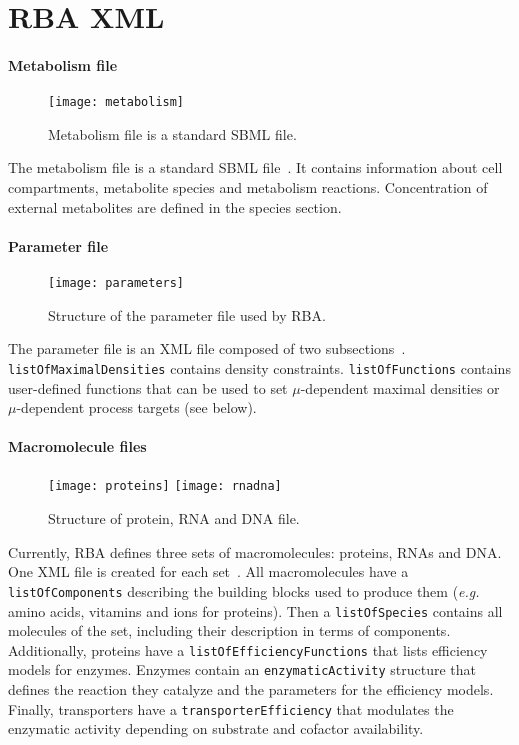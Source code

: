 
\section{RBA XML}
\label{sec:rba_xml}

\paragraph{Metabolism file}
\begin{figure}[ht]
  \centering
  \texttt{[image: metabolism]}
  \caption{Metabolism file is a standard SBML file.}
  \label{fig:metabolism}
\end{figure}
The metabolism file is a standard SBML file~. It contains information about cell compartments, metabolite species and metabolism reactions. Concentration of external metabolites are defined in the species section.

\paragraph{Parameter file}
\begin{figure}[ht]
  \centering
  \texttt{[image: parameters]}
  \caption{Structure of the parameter file used by RBA.}
  \label{fig:parameters}
\end{figure}
The parameter file is an XML file composed of two subsections~. \texttt{listOfMaximalDensities} contains density constraints. \texttt{listOfFunctions} contains user-defined functions that can be used to set $\mu$-dependent maximal densities or $\mu$-dependent process targets (see below).

\paragraph{Macromolecule files}
\begin{figure}[ht]
  \centering
  \texttt{[image: proteins]}
  \texttt{[image: rnadna]}
  \caption{Structure of protein, RNA and DNA file.}
  \label{fig:proteins}
\end{figure}
Currently, RBA defines three sets of macromolecules: proteins, RNAs and DNA. One XML file is created for each set~. All macromolecules have a \texttt{listOfComponents} describing the building blocks used to produce them (\textit{e.g.} amino acids, vitamins and ions for proteins). Then a \texttt{listOfSpecies} contains all molecules of the set, including their description in terms of components. Additionally, proteins have a \texttt{listOfEfficiencyFunctions} that lists efficiency models for enzymes. Enzymes contain an \texttt{enzymaticActivity} structure that defines the reaction they catalyze and the parameters for the efficiency models. Finally, transporters have a \texttt{transporterEfficiency} that modulates the enzymatic activity depending on substrate and cofactor availability.

